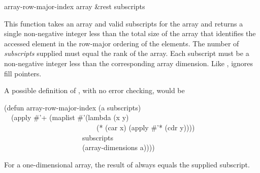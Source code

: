 \begin{defun}[Function]
array-row-major-index array &rest subscripts

This function takes an array and valid subscripts for the array
and returns a single non-negative integer less than the total size
of the array that identifies the
accessed element in the row-major ordering of the elements.
The number of {\it subscripts} supplied must equal the rank of the array.
Each subscript must be a non-negative integer less than the
corresponding array dimension.
Like ,  ignores fill pointers.

A possible definition of , with no error checking,
would be
\begin{lisp}
(defun array-row-major-index (a  subscripts) \\
~~(apply \#'+ (maplist \#'(lambda (x y) \\
~~~~~~~~~~~~~~~~~~~~~~~~~~(* (car x) (apply \#'* (cdr y)))) \\
~~~~~~~~~~~~~~~~~~~~~~subscripts \\
~~~~~~~~~~~~~~~~~~~~~~(array-dimensions a))))
\end{lisp}
For a one-dimensional array, the result of 
always equals the supplied subscript.
\end{defun}

